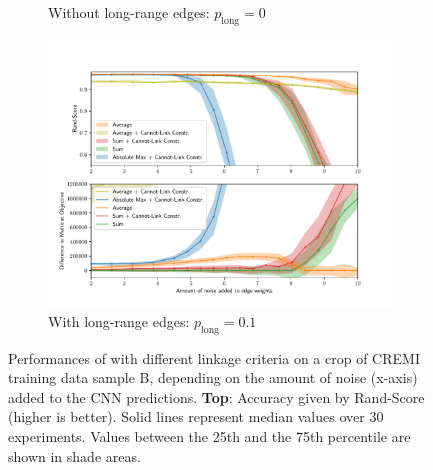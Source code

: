 \begin{figure}
\begin{subfigure}[t]{0.49 \textwidth}
        \caption{Without long-range edges: $p_{\mathrm{long}}=0$} \label{fig:merge_noise_only_direct}
    \end{subfigure} \hfill
    \begin{subfigure}[t]{0.49 \textwidth}
        \centering
        \includegraphics[width=\textwidth,trim=0.53in 0.35in 0.65in 0.80in,clip]{./figs/merge_noise_long_range.pdf}
        \caption{With long-range edges: $p_{\mathrm{long}}=0.1$} \label{fig:merge_noise_with_long_range}
    \end{subfigure}
\caption{Performances of \algname{} with different linkage criteria on a crop of CREMI training data sample B, depending on the amount of noise (x-axis) added to the CNN predictions. \textbf{Top}: Accuracy given by Rand-Score (higher is better). Solid lines represent median values over 30 experiments. Values between the 25th and the 75th percentile are shown in shade areas. 
}\label{fig:noise_plots}
\end{figure}


